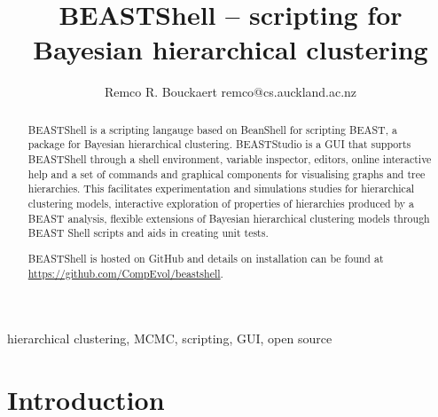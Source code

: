 \documentclass[twoside,11pt]{article}
\begin{document}
\title{BEASTShell -- scripting for Bayesian hierarchical clustering}
\author{\name Remco R. Bouckaert \email remco@cs.auckland.ac.nz}
\editor{---}
\maketitle

\begin{abstract}
BEASTShell is a scripting langauge based on BeanShell for scripting BEAST,
a package for Bayesian hierarchical clustering. BEASTStudio is a GUI that 
supports BEASTShell through a shell environment, variable inspector, editors, 
online interactive help and a set of commands and graphical components for 
visualising graphs and tree hierarchies.
This facilitates experimentation and simulations studies for hierarchical clustering models,
interactive exploration of properties of hierarchies produced by a BEAST 
analysis, flexible extensions of Bayesian hierarchical clustering models 
through BEAST Shell scripts and aids in creating unit tests.

BEASTShell is hosted on GitHub and details on installation can be found at
\url{https://github.com/CompEvol/beastshell}.
\end{abstract}
\begin{keywords}
  hierarchical clustering, MCMC, scripting, GUI, open source
\end{keywords}

\section{Introduction}
\end{document}
